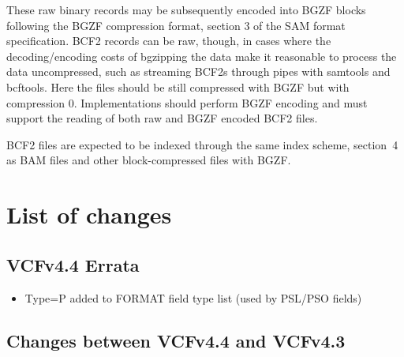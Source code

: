 \documentclass[8pt]{article}
\begin{document}
These raw binary records may be subsequently encoded into BGZF blocks following the BGZF compression format, section 3 of the SAM format specification.
BCF2 records can be raw, though, in cases where the decoding/encoding costs of bgzipping the data make it reasonable to process the data uncompressed, such as streaming BCF2s through pipes with samtools and bcftools.
Here the files should be still compressed with BGZF but with compression 0.
Implementations should perform BGZF encoding and must support the reading of both raw and BGZF encoded BCF2 files.

BCF2 files are expected to be indexed through the same index scheme, section~4 as BAM files and other block-compressed files with BGZF.

\section{List of changes}

\subsection{VCFv4.4 Errata}

\begin{itemize}
	\item Type=P added to FORMAT field type list (used by PSL/PSO fields)
\end{itemize}

\subsection{Changes between VCFv4.4 and VCFv4.3}
\end{document}
